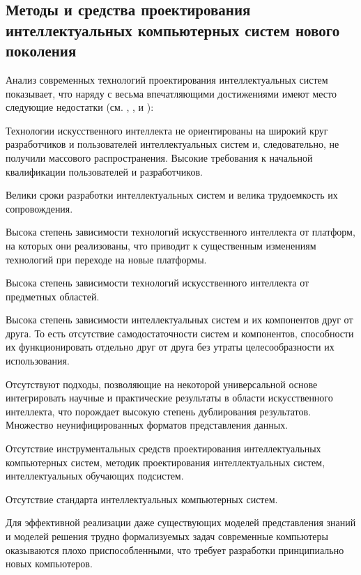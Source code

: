 
\begin{partbacktext}
\part{Методы и средства проектирования интеллектуальных компьютерных систем нового поколения}
\noindent
Анализ современных технологий проектирования интеллектуальных систем показывает, что
наряду с весьма впечатляющими достижениями имеют место следующие недостатки (см. , ,  и ):
\begin{textitemize}
	\item{Технологии искусственного интеллекта не ориентированы на широкий круг разработчиков и пользователей интеллектуальных систем и, следовательно, не получили массового распространения. Высокие требования к начальной квалификации пользователей и разработчиков.}
	\item{Велики сроки разработки интеллектуальных систем и велика трудоемкость их
		сопровождения.}
	\item{Высока степень зависимости технологий искусственного интеллекта от платформ, на которых
		они реализованы, что приводит к существенным изменениям технологий при переходе на
		новые платформы.}
	\item{Высока степень зависимости технологий искусственного интеллекта от предметных областей.}
	\item{Высока степень зависимости интеллектуальных систем и их компонентов друг от друга. То есть отсутствие самодостаточности систем и компонентов, способности их функционировать отдельно друг от друга без утраты целесообразности их использования.}
	\item{Отсутствуют подходы, позволяющие на некоторой универсальной основе интегрировать научные и практические результаты в области искусственного интеллекта, что порождает высокую степень дублирования результатов. Множество неунифицированных форматов представления данных.}
	\item{Отсутствие инструментальных средств проектирования интеллектуальных компьютерных систем, методик проектирования интеллектуальных систем, интеллектуальных обучающих подсистем.}
	\item{Отсутствие стандарта интеллектуальных компьютерных систем.}
	\item{Для эффективной реализации даже существующих моделей представления знаний и моделей
		решения трудно формализуемых задач современные компьютеры оказываются плохо
		приспособленными, что требует разработки принципиально новых компьютеров.}
\end{textitemize}


\end{partbacktext}
